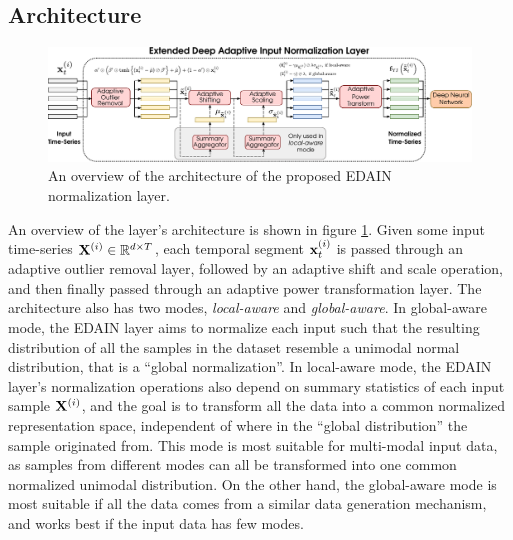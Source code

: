 \documentclass{statsmsc}
\begin{document}
\subsection{Architecture}%
\label{sub:Architecture}

\begin{figure}
\begin{center}
    \includegraphics[width=\textwidth]{diagrams/edain-diagram.pdf}
\end{center}
\caption{An overview of the architecture of the proposed \ac{EDAIN} normalization layer.}
\label{fig:edain-arch}
\end{figure}

An overview of the layer's architecture is shown in figure \cref{fig:edain-arch}.
Given some input time-series $\mathbf{X}^{(i)} \in \mathbb{R}^{d \times T}$, each temporal segment
$\mathbf{x}^{(i)}_t$ is passed through an adaptive outlier removal layer, followed by an adaptive shift
and scale operation, and then finally passed through an adaptive power transformation layer.
The architecture also has two modes, \textit{local-aware} and \textit{global-aware}. In
global-aware mode, the \ac{EDAIN} layer aims to normalize each input such that the resulting
distribution of all the samples in the dataset resemble a unimodal normal distribution, that is
a ``global normalization''. In local-aware mode,
the \ac{EDAIN} layer's normalization operations
also depend on summary statistics of each input sample $\mathbf{X}^{(i)}$, and the goal is to transform
all the data into a common normalized representation space, independent of where in the
``global distribution'' the sample originated from. This mode is most suitable for
multi-modal input data, as samples from different modes can all be transformed into one common
normalized unimodal distribution. On the other hand, the global-aware mode
is most suitable if all the data comes from a similar data generation mechanism,
and works best if the input data has few modes.
\end{document}
